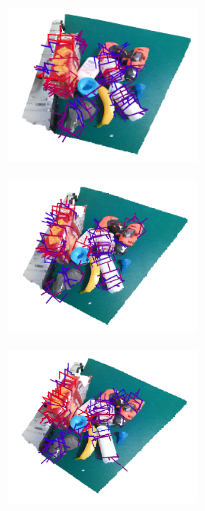 \begin{figure}[h!]
  
    \begin{subfigure}[b]{0.32\linewidth}
    \includegraphics[width=5cm]{figs/Attention_module_results/SE.png}
  \caption{}  
  \end{subfigure}   
  \begin{subfigure}[b]{0.32\linewidth}
    \includegraphics[width=5cm]{figs/Attention_module_results/CGNL.png}
    \caption{} 
  \end{subfigure}   
      \begin{subfigure}[b]{0.32\linewidth}
    \includegraphics[width=5cm]{figs/Attention_module_results/DANet.png}
    \caption{} 
  \end{subfigure} 
  
   

\end{figure}
